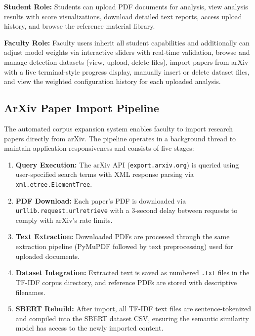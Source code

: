 \documentclass[conference]{IEEEtran}
\begin{document}
\textbf{Student Role:} Students can upload PDF documents for analysis, view analysis results with score visualizations, download detailed text reports, access upload history, and browse the reference material library.

\textbf{Faculty Role:} Faculty users inherit all student capabilities and additionally can adjust model weights via interactive sliders with real-time validation, browse and manage detection datasets (view, upload, delete files), import papers from arXiv with a live terminal-style progress display, manually insert or delete dataset files, and view the weighted configuration history for each uploaded analysis.

\subsection{ArXiv Paper Import Pipeline}

The automated corpus expansion system enables faculty to import research papers directly from arXiv. The pipeline operates in a background thread to maintain application responsiveness and consists of five stages:

\begin{enumerate}
\item \textbf{Query Execution:} The arXiv API (\texttt{export.arxiv.org}) is queried using user-specified search terms with XML response parsing via \texttt{xml.etree.ElementTree}.

\item \textbf{PDF Download:} Each paper's PDF is downloaded via \texttt{urllib.request.urlretrieve} with a 3-second delay between requests to comply with arXiv's rate limits.

\item \textbf{Text Extraction:} Downloaded PDFs are processed through the same extraction pipeline (PyMuPDF followed by text preprocessing) used for uploaded documents.

\item \textbf{Dataset Integration:} Extracted text is saved as numbered \texttt{.txt} files in the TF-IDF corpus directory, and reference PDFs are stored with descriptive filenames.

\item \textbf{SBERT Rebuild:} After import, all TF-IDF text files are sentence-tokenized and compiled into the SBERT dataset CSV, ensuring the semantic similarity model has access to the newly imported content.
\end{enumerate}
\end{document}
